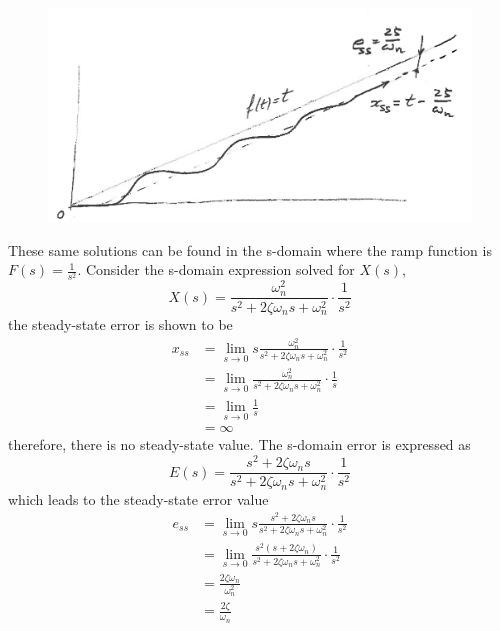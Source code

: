 \documentclass[12pt,letter]{article}
\numberwithin{ex}{section} %
\numberwithin{re}{section} %
\numberwithin{equation}{section}	%
\begin{document}
\begin{figure}[H]
	\centering
	\includegraphics[width=5.5in]{../figures/ramp_response_2nd_order_with_steady_state_error_annotated}
\end{figure}

These same solutions can be found in the s-domain where the ramp function is $F(s)=\frac{1}{s^2}$. Consider the s-domain expression solved for $X(s)$, 
\begin{equation}
X(s) = \frac{\omega_n^2}{s^2 + 2 \zeta \omega_n s + \omega_n^2}  \cdot \frac{1}{s^2} 
\end{equation}
the steady-state error is shown to be
\begin{align}
x_{ss} &= \lim\limits_{s \rightarrow 0} s \frac{\omega_n^2}{s^2 + 2 \zeta \omega_n s + \omega_n^2} \cdot \frac{1}{s^2}  \\
&= \lim\limits_{s \rightarrow 0} \frac{\omega_n^2}{s^2 + 2 \zeta \omega_n s + \omega_n^2} \cdot \frac{1}{s}  \nonumber \\
&= \lim\limits_{s \rightarrow 0}\frac{1}{s}  \nonumber \\
&= \infty  \nonumber
\end{align}
therefore, there is no steady-state value. The s-domain error is expressed as
\begin{equation}
E(s) = \frac{s^2 + 2 \zeta \omega_n s}{s^2 + 2 \zeta \omega_n s + \omega_n^2} \cdot \frac{1}{s^2}
\end{equation}
which leads to the steady-state error value
\begin{align}
e_{ss} &= \lim\limits_{s \rightarrow 0}  s \frac{s^2 + 2 \zeta \omega_n s}{s^2 + 2 \zeta \omega_n s + \omega_n^2} \cdot \frac{1}{s^2} \\
&= \lim\limits_{s \rightarrow 0}   \frac{s^2( s + 2 \zeta \omega_n)}{s^2 + 2 \zeta \omega_n s + \omega_n^2} \cdot \frac{1}{s^2} \nonumber  \\ 
&= \frac{2 \zeta \omega_n}{\omega_n^2}   \nonumber \\
&= \frac{2 \zeta }{\omega_n}   \nonumber
\end{align}
\end{document}
